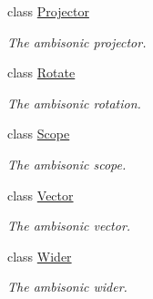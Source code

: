 \begin{DoxyCompactItemize}
class \hyperlink{class_hoa2_d_1_1_projector}{Projector}
\begin{DoxyCompactList}\small\item\em The ambisonic projector. \end{DoxyCompactList}\item 
class \hyperlink{class_hoa2_d_1_1_rotate}{Rotate}
\begin{DoxyCompactList}\small\item\em The ambisonic rotation. \end{DoxyCompactList}\item 
class \hyperlink{class_hoa2_d_1_1_scope}{Scope}
\begin{DoxyCompactList}\small\item\em The ambisonic scope. \end{DoxyCompactList}\item 
class \hyperlink{class_hoa2_d_1_1_vector}{Vector}
\begin{DoxyCompactList}\small\item\em The ambisonic vector. \end{DoxyCompactList}\item 
class \hyperlink{class_hoa2_d_1_1_wider}{Wider}
\begin{DoxyCompactList}\small\item\em The ambisonic wider. \end{DoxyCompactList}\end{DoxyCompactItemize}

